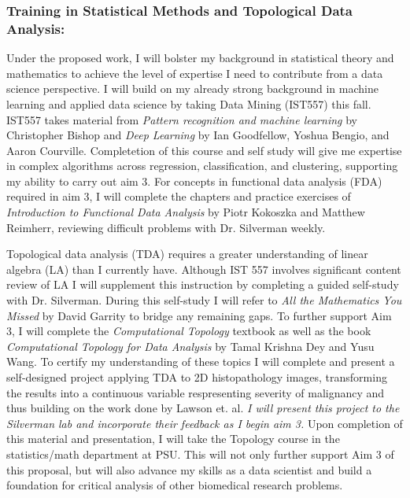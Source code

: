 \documentclass{NIHGrant}
\begin{document}
\subsubsection*{Training in Statistical Methods and Topological Data Analysis:}
Under the proposed work, I will bolster my background in statistical theory and mathematics to achieve the level of expertise I need to contribute from a data science perspective. I will build on my already strong background in machine learning and applied data science by taking Data Mining (IST557) this fall. IST557 takes material from \textit{Pattern recognition and machine learning} by Christopher Bishop and \textit{Deep Learning} by Ian Goodfellow, Yoshua Bengio, and Aaron Courville. Completetion of this course and self study will give me expertise in complex algorithms across regression, classification, and clustering, supporting my ability to carry out aim 3. For concepts in functional data analysis (FDA) required in aim 3, I will complete the chapters and practice exercises of \textit{Introduction to Functional Data Analysis} by Piotr Kokoszka and Matthew Reimherr, reviewing difficult problems with Dr. Silverman weekly.

Topological data analysis (TDA) requires a greater understanding of linear algebra (LA) than I currently have. Although IST 557 involves significant content review of LA I will supplement this instruction by completing a guided self-study with Dr. Silverman. During this self-study I will refer to \textit{All the Mathematics You Missed} by David Garrity to bridge any remaining gaps. To further support Aim 3, I will complete the \textit{Computational Topology} textbook as well as the book \textit{Computational Topology for Data Analysis} by Tamal Krishna Dey and Yusu Wang. To certify my understanding of these topics I will complete and present a self-designed project applying TDA to 2D histopathology images, transforming the results into a continuous variable respresenting severity of malignancy and thus building on the work done by Lawson et. al. \emph{I will present this project to the Silverman lab and incorporate their feedback as I begin aim 3.} Upon completion of this material and presentation, I will take the Topology course in the statistics/math department at PSU. This will not only further support Aim 3 of this proposal, but will also advance my skills as a data scientist and build a foundation for critical analysis of other biomedical research problems.
\end{document}
